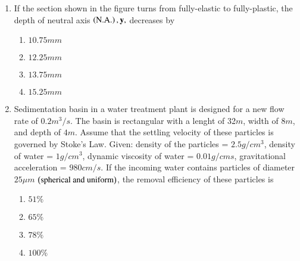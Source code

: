 \documentclass[journal,12pt,onecolumn]{IEEEtran}
\theoremstyle{remark}
\begin{document}
\begin{enumerate}
    \item If the section shown in the figure turns from fully-elastic to fully-plastic, the depth of 
        neutral axis $\left(\text{N.A.}\right), \mathbf{y},$ decreases by 
\begin{center}
            \resizebox{0.5\textwidth}{!}{
                
            } 
        \end{center}
        \hfill{}
 \begin{multicols}{4}
            \begin{enumerate}
                \item $10.75mm$
                    \columnbreak
                \item $12.25mm$
                    \columnbreak
                \item $13.75mm$
                    \columnbreak
                \item $15.25mm$
            \end{enumerate}
        \end{multicols}

    \item Sedimentation basin in a water treatment plant is designed for a new flow rate of $0.2m^3/s$.
        The basin is rectangular with a lenght of 32$m$, width of $8m$, and depth of $4m$. Assume that the
        settling velocity of these particles is governed by Stoke's Law. Given: density of the particles = 
        $2.5g/cm^3$, density of water = $1 g/cm^3$, dynamic viscosity of water = $0.01 g/cm s$, gravitational
        acceleration = $980 cm/s$. If the incoming water contains particles of diameter $25 \mu m$ 
        $\left(\text{spherical and uniform}\right)$, the removal efficiency of these particles is
        \hfill{}
     \begin{multicols}{4}
            \begin{enumerate}
                \item $51\%$
                    \columnbreak
                \item $65\%$
                    \columnbreak
                \item $78\%$
                    \columnbreak
                \item $100\%$
            \end{enumerate}
        \end{multicols}


\end{enumerate}
\end{document}

